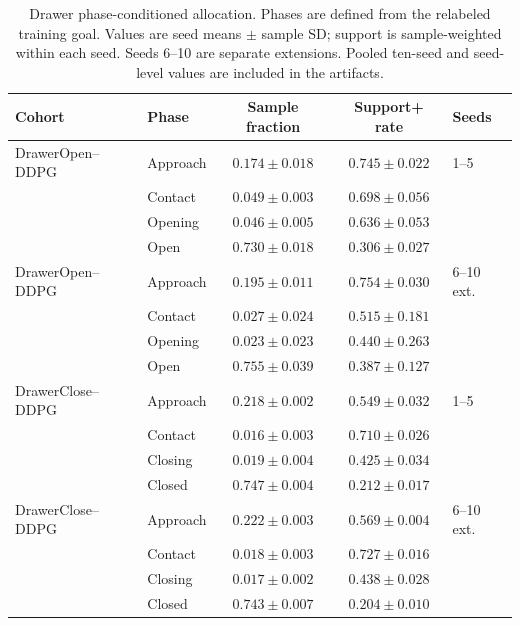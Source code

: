 \begin{table}[t]
\centering
\small
\setlength{\tabcolsep}{7pt}
\begin{tabular}{llccl}
\toprule
Cohort & Phase & Sample fraction & Support+ rate & Seeds \\
\midrule
DrawerOpen--DDPG & Approach & \(0.174\pm0.018\) & \(0.745\pm0.022\) & 1--5 \\
 & Contact & \(0.049\pm0.003\) & \(0.698\pm0.056\) & \\
 & Opening & \(0.046\pm0.005\) & \(0.636\pm0.053\) & \\
 & Open & \(0.730\pm0.018\) & \(0.306\pm0.027\) & \\
\addlinespace[2pt]
DrawerOpen--DDPG & Approach & \(0.195\pm0.011\) & \(0.754\pm0.030\) &
6--10 ext. \\
 & Contact & \(0.027\pm0.024\) & \(0.515\pm0.181\) & \\
 & Opening & \(0.023\pm0.023\) & \(0.440\pm0.263\) & \\
 & Open & \(0.755\pm0.039\) & \(0.387\pm0.127\) & \\
\addlinespace[2pt]
DrawerClose--DDPG & Approach & \(0.218\pm0.002\) & \(0.549\pm0.032\) & 1--5 \\
 & Contact & \(0.016\pm0.003\) & \(0.710\pm0.026\) & \\
 & Closing & \(0.019\pm0.004\) & \(0.425\pm0.034\) & \\
 & Closed & \(0.747\pm0.004\) & \(0.212\pm0.017\) & \\
\addlinespace[2pt]
DrawerClose--DDPG & Approach & \(0.222\pm0.003\) & \(0.569\pm0.004\) &
6--10 ext. \\
 & Contact & \(0.018\pm0.003\) & \(0.727\pm0.016\) & \\
 & Closing & \(0.017\pm0.002\) & \(0.438\pm0.028\) & \\
 & Closed & \(0.743\pm0.007\) & \(0.204\pm0.010\) & \\
\bottomrule
\end{tabular}
\caption{Drawer phase-conditioned allocation. Phases are defined from the
relabeled training goal. Values are seed means \(\pm\) sample SD; support is
sample-weighted within each seed. Seeds 6--10 are separate extensions.
Pooled ten-seed and seed-level values are included in the artifacts.}
\label{tab:supp-phase-diagnostics}
\end{table}
